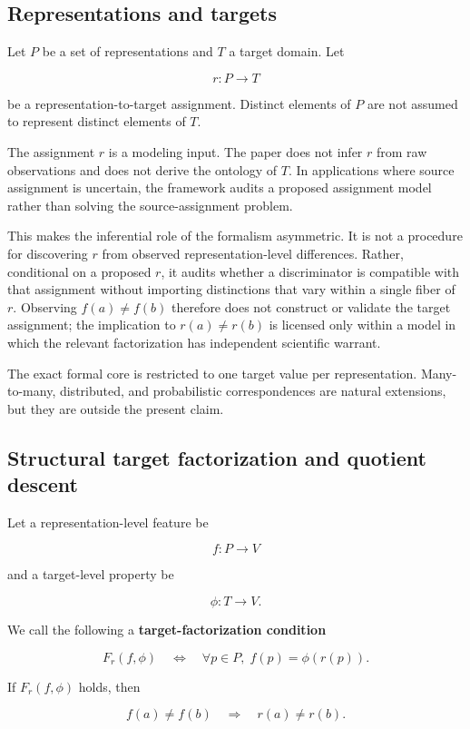 \documentclass[11pt]{article}
\begin{document}
\subsection{Representations and targets}

Let \(P\) be a set of representations and \(T\) a target domain. Let

\[
r:P\to T
\]

be a representation-to-target assignment. Distinct elements of \(P\) are not assumed to represent distinct elements of \(T\).

The assignment \(r\) is a modeling input. The paper does not infer \(r\) from raw observations and does not derive the ontology of \(T\). In applications where source assignment is uncertain, the framework audits a proposed assignment model rather than solving the source-assignment problem.

This makes the inferential role of the formalism asymmetric. It is not a procedure for discovering \(r\) from observed representation-level differences. Rather, conditional on a proposed \(r\), it audits whether a discriminator is compatible with that assignment without importing distinctions that vary within a single fiber of \(r\). Observing \(f(a)\neq f(b)\) therefore does not construct or validate the target assignment; the implication to \(r(a)\neq r(b)\) is licensed only within a model in which the relevant factorization has independent scientific warrant.

The exact formal core is restricted to one target value per representation. Many-to-many, distributed, and probabilistic correspondences are natural extensions, but they are outside the present claim.

\subsection{Structural target factorization and quotient descent}

Let a representation-level feature be

\[
f:P\to V
\]

and a target-level property be

\[
\phi:T\to V.
\]

We call the following a \textbf{target-factorization condition}

\[
F_r(f,\phi)
\quad\Longleftrightarrow\quad
\forall p\in P,\; f(p)=\phi(r(p)).
\]

If \(F_r(f,\phi)\) holds, then

\[
f(a)\neq f(b)
\quad\Longrightarrow\quad
r(a)\neq r(b).
\]
\end{document}
